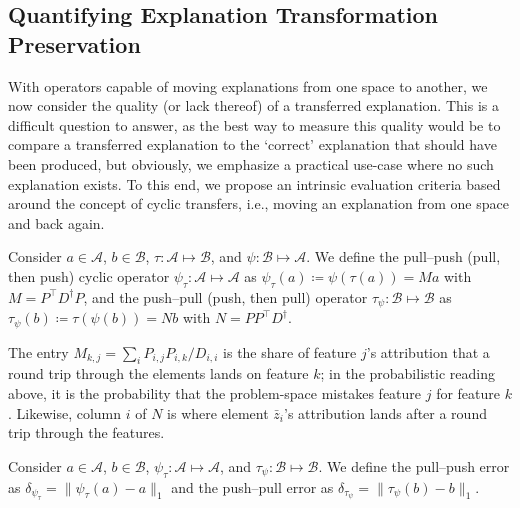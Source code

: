 
\subsection{Quantifying Explanation Transformation Preservation}
\label{sec:Framework:Preservation}

With operators capable of moving explanations from one space to another, we now consider the quality (or lack thereof) of a transferred explanation. This is a difficult question to answer, as the best way to measure this quality would be to compare a transferred explanation to the `correct' explanation that should have been produced, but obviously, we emphasize a practical use-case where no such explanation exists. To this end, we propose an intrinsic evaluation criteria based around the concept of cyclic transfers, i.e., moving an explanation from one space and back again.

\label{def:CyclicTransfers}
{
Consider $a \in \mathcal{A}$, $b \in \mathcal{B}$, $\tau: \mathcal{A} \mapsto \mathcal{B}$, and $\psi: \mathcal{B} \mapsto \mathcal{A}$. We define the pull--push (pull, then push) cyclic operator $\psi_\tau: \mathcal{A} \mapsto \mathcal{A}$ as $\psi_\tau(a) \coloneq \psi(\tau(a)) = M a$ with $M = P^\top D^\dagger P$, and the push--pull (push, then pull) operator $\tau_\psi: \mathcal{B} \mapsto \mathcal{B}$ as $\tau_\psi(b) \coloneq \tau(\psi(b)) = N b$ with $N = P P^\top D^\dagger$.
}

The entry $M_{k,j} = \sum_i P_{i,j} P_{i,k} / D_{i,i}$ is the share of feature $j$'s attribution that a round trip through the elements lands on feature $k$; in the probabilistic reading above, it is the probability that the problem-space mistakes feature $j$ for feature $k$. Likewise, column $i$ of $N$ is where element $\bar{z}_i$'s attribution lands after a round trip through the features.

\label{def:CyclicTransferError}
{
Consider $a \in \mathcal{A}$, $b \in \mathcal{B}$, $\psi_\tau: \mathcal{A} \mapsto \mathcal{A}$, and $\tau_\psi: \mathcal{B} \mapsto \mathcal{B}$. We define the pull--push error as $\delta_{\psi_\tau} = \|\psi_\tau(a) - a\|_1$ and the push--pull error as $\delta_{\tau_\psi} = \|\tau_\psi(b) - b\|_1$.
}

